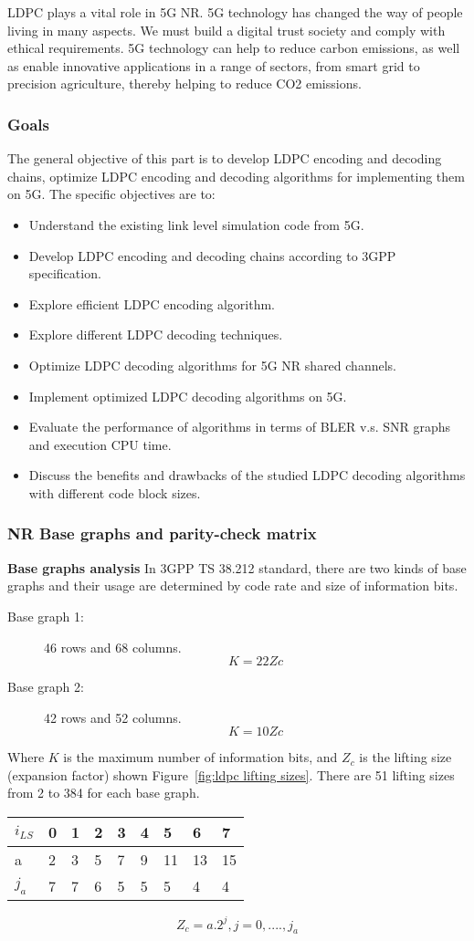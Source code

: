 LDPC plays a vital role in 5G NR. 5G technology has changed the way of people living in many aspects. We must build a digital trust society and comply with ethical requirements.
5G technology can help to reduce carbon emissions, as well as enable innovative applications in a range of sectors, from smart grid to precision agriculture, thereby helping to reduce CO2 emissions.

\subsubsection{Goals} 
The general objective of this part is to develop LDPC encoding and decoding chains, optimize LDPC encoding and decoding algorithms for implementing them on 5G. The specific objectives are to:
\begin{itemize}
    \item Understand the existing link level simulation code from 5G.
    \item Develop LDPC encoding and decoding chains according to 3GPP specification.
    \item Explore efficient LDPC encoding algorithm.
    \item Explore different LDPC decoding techniques.
    \item Optimize LDPC decoding algorithms for 5G NR shared channels.
    \item Implement optimized LDPC decoding algorithms on 5G.
    \item Evaluate the performance of algorithms in terms of BLER v.s. SNR graphs and execution CPU time.
    \item Discuss the benefits and drawbacks of the studied LDPC decoding algorithms with different code block sizes.
\end{itemize}

\subsubsection{NR Base graphs and parity-check matrix}
\textbf{Base graphs analysis}
In 3GPP TS 38.212 standard, there are two kinds of base graphs and their usage are determined by code rate and size of information bits. 
\begin{description}
    \item[Base graph 1:] 46 rows and 68 columns.
    \[K = 22Zc\]
    \item[Base graph 2:] 42 rows and 52 columns.
    \[K = 10Zc\]
\end{description}
Where $K$ is the maximum number of information bits, and $Z_c$ is the lifting size (expansion factor) shown Figure~\ref{fig:ldpc lifting sizes}. There are 51 lifting sizes from 2 to 384 for each base graph.
\begin{tabularx}{0.8\textwidth} { | m{1em} | m{1cm}| m{1cm} | m{1em} | m{1cm}| m{1cm} | m{1em} | m{1cm}| m{1cm} | } 
    \hline
    $i_{LS}$ & 0 & 1 & 2 & 3 & 4 & 5 & 6 & 7 \\
    \hline
    a & 2 & 3 & 5 & 7 & 9 & 11 & 13 & 15 \\
    \hline
    $j_a$ & 7 & 7 & 6 & 5 & 5 & 5 & 4 & 4 \\
    \hline
\end{tabularx}
\[Z_c = a.2^j     , j = 0,...., j_a\]

